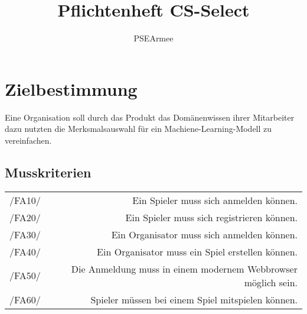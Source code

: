 \documentclass[a4paper]{scrreprt}
\begin{document}
 
\title{Pflichtenheft CS-Select}
\author{PSEArmee}
\maketitle
 
\tableofcontents
 
\chapter{Zielbestimmung}
Eine Organisation soll durch das \Gls{Produkt} das Domänenwissen ihrer Mitarbeiter dazu nutzten die Merksmalsauswahl für ein Machiene-Learning-Modell zu vereinfachen. 
\section{Musskriterien}
\begin{tabular}{ l | r}
/FA10/ & Ein \Gls{Spieler} muss sich anmelden können. \\ 
/FA20/ & Ein \Gls{Spieler} muss sich registrieren können. \\
/FA30/ & Ein \Gls{Organisator} muss sich anmelden können. \\
/FA40/ & Ein \Gls{Organisator} muss ein \Gls{Spiel} erstellen können. \\
/FA50/ & Die Anmeldung muss in einem modernem \Gls{Webbrowser} möglich sein. \\
/FA60/ & \Gls{Spieler} müssen bei einem \Gls{Spiel} mitspielen können. \\
\end{tabular} 
\end{document}
